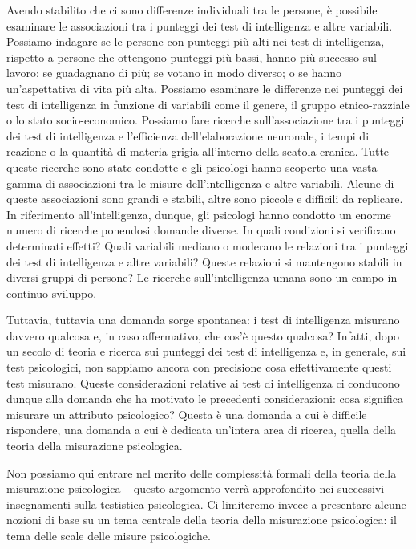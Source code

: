 \documentclass[
  11pt,
]{krantz}
\theoremstyle{definition}
\theoremstyle{definition}
\theoremstyle{definition}
\theoremstyle{definition}
\theoremstyle{remark}
\begin{document}
Avendo stabilito che ci sono differenze individuali tra le persone, è possibile esaminare le associazioni tra i punteggi dei test di intelligenza e altre variabili. Possiamo indagare se le persone con punteggi più alti nei test di intelligenza, rispetto a persone che ottengono punteggi più bassi, hanno più successo sul lavoro; se guadagnano di più; se votano in modo diverso; o se hanno un'aspettativa di vita più alta. Possiamo esaminare le differenze nei punteggi dei test di intelligenza in funzione di variabili come il genere, il gruppo etnico-razziale o lo stato socio-economico. Possiamo fare ricerche sull'associazione tra i punteggi dei test di intelligenza e l'efficienza dell'elaborazione neuronale, i tempi di reazione o la quantità di materia grigia all'interno della scatola cranica. Tutte queste ricerche sono state condotte e gli psicologi hanno scoperto una vasta gamma di associazioni tra le misure dell'intelligenza e altre variabili. Alcune di queste associazioni sono grandi e stabili, altre sono piccole e difficili da replicare. In riferimento all'intelligenza, dunque, gli psicologi hanno condotto un enorme numero di ricerche ponendosi domande diverse. In quali condizioni si verificano determinati effetti? Quali variabili mediano o moderano le relazioni tra i punteggi dei test di intelligenza e altre variabili? Queste relazioni si mantengono stabili in diversi gruppi di persone? Le ricerche sull'intelligenza umana sono un campo in continuo sviluppo.

Tuttavia, tuttavia una domanda sorge spontanea: i test di intelligenza misurano davvero qualcosa e, in caso affermativo, che cos'è questo qualcosa? Infatti, dopo un secolo di teoria e ricerca sui punteggi dei test di intelligenza e, in generale, sui test psicologici, non sappiamo ancora con precisione cosa effettivamente questi test misurano. Queste considerazioni relative ai test di intelligenza ci conducono dunque alla domanda che ha motivato le precedenti considerazioni: cosa significa misurare un attributo psicologico? Questa è una domanda a cui è difficile rispondere, una domanda a cui è dedicata un'intera area di ricerca, quella della teoria della misurazione psicologica.

Non possiamo qui entrare nel merito delle complessità formali della teoria della misurazione psicologica -- questo argomento verrà approfondito nei successivi insegnamenti sulla testistica psicologica. Ci limiteremo invece a presentare alcune nozioni di base su un tema centrale della teoria della misurazione psicologica: il tema delle scale delle misure psicologiche.
\end{document}
